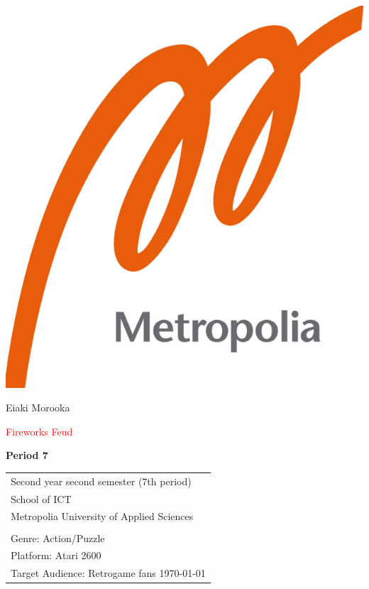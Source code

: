 \documentclass{article}
\begin{document}
\begin{center}
\includegraphics[scale=0.2]{logo.png}
\end{center}

\vspace{0.5cm}

\begin{center}

 Eiaki Morooka \\

\vspace{0.5cm}

{\Huge \textcolor{red}{Fireworks Feud}} \\


\vspace{0.5cm}

{\Large \textbf{Period 7}} \\


\end{center}

\vspace{1cm}

\begin{center}

{\Large }



\begin{tabular}{l}
 Second year second semester (7th period)\\
 School of ICT\\
 Metropolia University of Applied Sciences  \\
 \\
 Genre: Action/Puzzle \\
 Platform: Atari 2600 \\
 Target Audience: Retrogame fans
 \today
\end{tabular}
\end{center}
\end{document}
